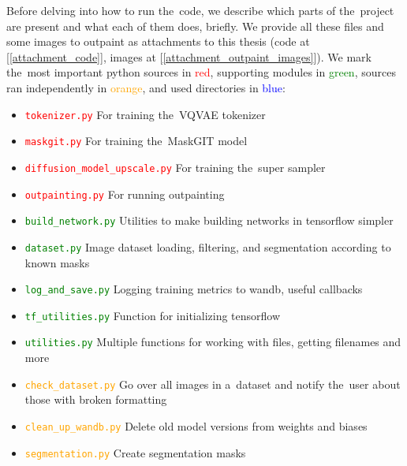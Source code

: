 Before delving into how to run the~code, we describe which parts of the~project are present and what each of them does, briefly. We provide all these files and some images to outpaint as attachments to this thesis (code at [\ref{attachment_code}], images at [\ref{attachment_outpaint_images}]). We mark the~most important python sources in \textcolor{red}{red}, supporting modules in \textcolor{green}{green}, sources ran independently in \textcolor{orange}{orange}, and used directories in \textcolor{blue}{blue}:
\begin{itemize}
    \item \textcolor{red}{\texttt{tokenizer.py}} For training the~VQVAE tokenizer
    \item \textcolor{red}{\texttt{maskgit.py}} For training the~MaskGIT model
    \item \textcolor{red}{\texttt{diffusion\_model\_upscale.py}} For training the~super sampler
    \item \textcolor{red}{\texttt{outpainting.py}} For running outpainting

    \item \textcolor{green}{\texttt{build\_network.py}} Utilities to make building networks in tensorflow simpler
    \item \textcolor{green}{\texttt{dataset.py}} Image dataset loading, filtering, and segmentation according to known masks
    \item \textcolor{green}{\texttt{log\_and\_save.py}} Logging training metrics to wandb, useful callbacks
    \item \textcolor{green}{\texttt{tf\_utilities.py}} Function for initializing tensorflow
    \item \textcolor{green}{\texttt{utilities.py}} Multiple functions for working with files, getting filenames and more

    \item \textcolor{orange}{\texttt{check\_dataset.py}} Go over all images in a~dataset and notify the~user about those with broken formatting
    \item \textcolor{orange}{\texttt{clean\_up\_wandb.py}} Delete old model versions from weights and biases
    \item \textcolor{orange}{\texttt{segmentation.py}} Create segmentation masks


\end{itemize}
